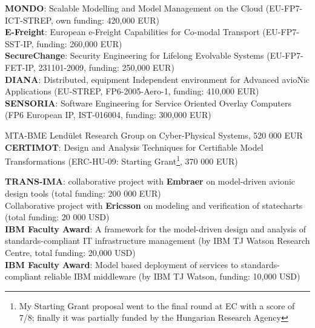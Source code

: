 \documentclass{xetexCV}
\begin{document}
\textbf{MONDO}:  Scalable Modelling and Model Management 
on the Cloud (EU-FP7-ICT-STREP, own funding: 420,000 EUR)  \\
\textbf{E-Freight}: European e-Freight Capabilities for
Co-modal Transport (EU-FP7-SST-IP, funding: 260,000 EUR)  \\
\textbf{SecureChange}: Security Engineering for Lifelong
Evolvable Systems (EU-FP7-FET-IP, 231101-2009, funding: 250,000 EUR)  \\ 
\textbf{DIANA}: Distributed, equipment Independent
environment for Advanced avioNic Applications (EU-STREP, FP6-2005-Aero-1, funding: 410,000 EUR) \\
\textbf{SENSORIA}: Software Engineering for Service Oriented
Overlay Computers (FP6 European IP, IST-016004, funding: 300,000 EUR)  



MTA-BME  Lend\"ulet Research Group on Cyber-Physical Systems, 520 000 EUR\\

\textbf{CERTIMOT}: Design and Analysis Techniques for
Certifiable Model Transformations (ERC-HU-09: Starting Grant\footnote{My
Starting Grant proposal went to the final round at EC with a score of 7/8;
finally it was partially funded by the Hungarian Research Agency}, 370 000 EUR) 



\textbf{TRANS-IMA}: collaborative project with \textbf{Embraer} on
model-driven avionic design tools (total funding: 200 000 EUR) \\

Collaborative project with \textbf{Ericsson} on
modeling and verification of statecharts (total funding: 20 000 USD)\\

\textbf{IBM Faculty Award}: A framework for the model-driven design
and analysis of standards-compliant IT infrastructure management (by IBM TJ Watson Research Centre,
total funding: 20,000 USD)  \\

\textbf{IBM Faculty Award}: Model based deployment of services to
standards-compliant reliable IBM middleware (by IBM TJ Watson,
funding: 10,000 USD)  \\
\end{document}
